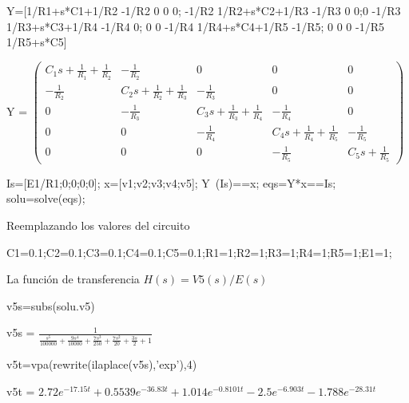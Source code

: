 \documentclass[10pt,a4paper]{article} %
\begin{document}
\begin{matlabcode}
	Y=[1/R1+s*C1+1/R2 -1/R2 0 0 0; -1/R2 1/R2+s*C2+1/R3 -1/R3 0 0;0 -1/R3 1/R3+s*C3+1/R4 -1/R4 0; 0 0 -1/R4 1/R4+s*C4+1/R5 -1/R5; 0 0 0 -1/R5 1/R5+s*C5]
\end{matlabcode}
\begin{matlabsymbolicoutput}
	Y = 
	$\displaystyle \left(\begin{array}{ccccc}
	C_1  s+\frac{1}{R_1 }+\frac{1}{R_2 } & -\frac{1}{R_2 } & 0 & 0 & 0\\
	-\frac{1}{R_2 } & C_2  s+\frac{1}{R_2 }+\frac{1}{R_3 } & -\frac{1}{R_3 } & 0 & 0\\
	0 & -\frac{1}{R_3 } & C_3  s+\frac{1}{R_3 }+\frac{1}{R_4 } & -\frac{1}{R_4 } & 0\\
	0 & 0 & -\frac{1}{R_4 } & C_4  s+\frac{1}{R_4 }+\frac{1}{R_5 } & -\frac{1}{R_5 }\\
	0 & 0 & 0 & -\frac{1}{R_5 } & C_5  s+\frac{1}{R_5 }
	\end{array}\right)$
\end{matlabsymbolicoutput}
\begin{matlabcode}
	Is=[E1/R1;0;0;0;0];
	x=[v1;v2;v3;v4;v5];
	Y\ (Is)==x;
	eqs=Y*x==Is;
	solu=solve(eqs);
	\end{matlabcode}
	
	
	\begin{par}
	\begin{flushleft}
	Reemplazando los valores del circuito
	\end{flushleft}
	\end{par}
	
	\begin{matlabcode}
	C1=0.1;C2=0.1;C3=0.1;C4=0.1;C5=0.1;R1=1;R2=1;R3=1;R4=1;R5=1;E1=1;
	\end{matlabcode}
	
	\begin{par}
	\begin{flushleft}
	La función de transferencia $ H(s)=V5(s)/E(s)$
	\end{flushleft}
	\end{par}
	
	\begin{matlabcode}
	v5s=subs(solu.v5)
	\end{matlabcode}
	\begin{matlabsymbolicoutput}
	v5s = 
	$\displaystyle \frac{1}{\frac{s^5 }{100000}+\frac{9 s^4 }{10000}+\frac{7 s^3 }{250}+\frac{7 s^2 }{20}+\frac{3 s}{2}+1}$
	\end{matlabsymbolicoutput}
	\begin{matlabcode}
	v5t=vpa(rewrite(ilaplace(v5s),'exp'),4)
	\end{matlabcode}
	\begin{matlabsymbolicoutput}
	v5t = 
	$\displaystyle 2.72 e^{-17.15 t} +0.5539 e^{-36.83 t} +1.014 e^{-0.8101 t} -2.5 e^{-6.903 t} -1.788 e^{-28.31 t} $
	\end{matlabsymbolicoutput}
	
\end{document}
